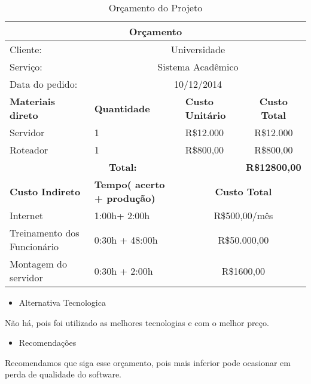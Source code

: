 \begin{table}[h]
\begin{tabular}{|p{4cm}|p{3cm}|p{3cm}|p{5cm}|p{2cm}|}
\hline
\multicolumn{5}{|c|}{\textbf{Orçamento}}                                                                                               \\ \hline
Cliente:                    & \multicolumn{4}{c|}{Universidade}                                                                        \\ \hline
Serviço:                    & \multicolumn{4}{c|}{Sistema Acadêmico}                                                                   \\ \hline
Data do pedido:             & \multicolumn{4}{c|}{10/12/2014}                                                                          \\ \hline
\textbf{Materiais direto}   & \textbf{Quantidade}                & \textbf{Custo Unitário} & \multicolumn{2}{c|}{\textbf{Custo Total}} \\ \hline
Servidor                    & 1                                  & R\$12.000               & \multicolumn{2}{c|}{R\$12.000}            \\ \hline
Roteador                    & 1                                  & R\$800,00               & \multicolumn{2}{c|}{R\$800,00}            \\ \hline
\multicolumn{3}{|c|}{\textbf{Total:}}                                                      & \multicolumn{2}{c|}{\textbf{R\$12800,00}} \\ \hline
\textbf{Custo Indireto}     & \textbf{Tempo( acerto + produção)} & \multicolumn{3}{c|}{\textbf{Custo Total}}                           \\ \hline
Internet                    & 1:00h+ 2:00h                       & \multicolumn{3}{c|}{R\$500,00/mês}                                  \\ \hline
Treinamento dos Funcionário & 0:30h + 48:00h                     & \multicolumn{3}{c|}{R\$50.000,00}                                   \\ \hline
Montagem do servidor        & 0:30h + 2:00h                      & \multicolumn{3}{c|}{R\$1600,00}                                     \\ \hline
\end{tabular}
\caption{Orçamento do Projeto}  \label{Orça}
\end{table}


\begin{itemize}
 \item Alternativa Tecnologica
\end{itemize}
Não há, pois foi utilizado as melhores tecnologias e com o melhor preço.

\begin{itemize}
 \item Recomendações
\end{itemize}
 Recomendamos que siga esse orçamento, pois mais inferior pode ocasionar em perda de qualidade do software.

